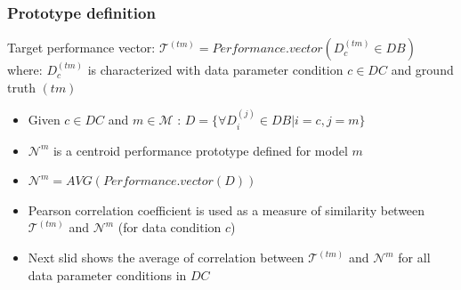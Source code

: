 \documentclass{beamer}
\begin{document}
\begin{frame}\frametitle{Prototype definition}
\small{Target performance vector:} $\mathcal{T}^{(tm)} = Performance.vector(D_c^{(tm)} \in DB)$ where: $D_c^{(tm)}$ is characterized with data parameter condition $c \in DC$ and ground truth $(tm)$  \pause
\begin{itemize}
\item Given $c \in DC$ and $m \in \mathcal{M}$ : $D = \{\forall D_i^{(j)} \in DB | i = c , j = m\}$
\item $\mathcal{N}^m$ is a centroid performance prototype defined for model $m$\pause
\item $\mathcal{N}^m = AVG(Performance.vector(D))$ \pause%
\item Pearson correlation coefficient is used as a measure of similarity between $\mathcal{T}^{(tm)}$ and $\mathcal{N}^m$ (for data condition $c$) \pause
\item Next slid shows the average of correlation between $\mathcal{T}^{(tm)}$ and $\mathcal{N}^m$ for all data parameter conditions in $DC$
\end{itemize}
\end{frame}
\end{document}
